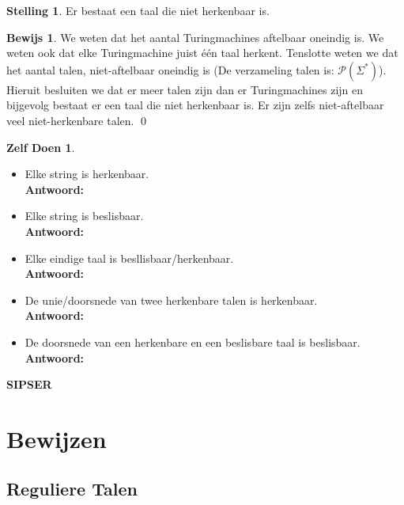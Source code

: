 \documentclass[12pt,a4paper]{article}
\theoremstyle{definition}
\newtheorem{stel}{Stelling}[section]
\newtheorem{zDoen}{Zelf Doen}[section]
\newtheorem{bewijs}{Bewijs}[section]
\begin{document}
	\newpage
\begin{stel}
	Er bestaat een taal die niet herkenbaar is.\\
	\begin{bewijs}
		We weten dat het aantal Turingmachines aftelbaar oneindig is. We weten ook dat elke Turingmachine juist één taal herkent. Tenslotte weten we dat het aantal talen, niet-aftelbaar oneindig is (De verzameling talen is: $\mathcal{P}(\Sigma^*)$).\\
		Hieruit besluiten we dat er meer talen zijn dan er Turingmachines zijn en bijgevolg bestaat er een taal die niet herkenbaar is. Er zijn zelfs niet-aftelbaar veel niet-herkenbare talen. \qed
	\end{bewijs}
\end{stel}
\begin{zDoen}
	\begin{itemize}
		\item Elke string is herkenbaar.\\
		\textbf{Antwoord:}
		\item Elke string is beslisbaar.\\
		\textbf{Antwoord:}
		\item Elke eindige taal is besllisbaar/herkenbaar.\\
		\textbf{Antwoord:}
		\item De unie/doorsnede van twee herkenbare talen is herkenbaar.\\
		\textbf{Antwoord:}
		\item De doorsnede van een herkenbare en een beslisbare taal is beslisbaar.\\
		\textbf{Antwoord:}
	\end{itemize}
\end{zDoen}
\newpage
\textbf{\LARGE SIPSER}\\

\section{Bewijzen}
\subsection{Reguliere Talen}
\end{document}
